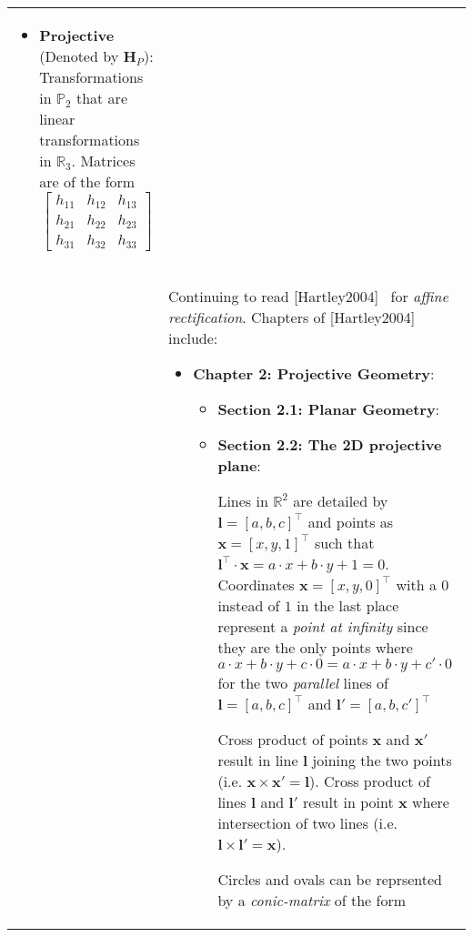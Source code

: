 \documentclass[a4paper,10pt]{article}
\newcommand{\logentry}[4]{\hline\\[-0.25ex]\selectlanguage{USenglish}\formatdate{#2}{#1}{#3}&{#4}\par\\[-0.25ex]}
\begin{document}
\begin{longtable}{l p{12cm} }
{{\begin{itemize}
\item \textbf{Projective} (Denoted by $\mathbf{H}_P$): Transformations in $\mathbb{P}_2$ that are linear transformations in $\mathbb{R}_3$. Matrices are of the form
\begin{equation*}
\begin{bmatrix}h_{11} & h_{12} & h_{13} \\ h_{21} & h_{22} & h_{23} \\ h_{31} & h_{32} & h_{33} \end{bmatrix}
\end{equation*}


\end{itemize}

}

	}
	\logentry{6}{29}{2016}{%
Continuing to read [Hartley2004]~\cite{Hartley2004} for \textit{affine rectification}. Chapters of [Hartley2004]~\cite{Hartley2004} include:\newline
\begin{itemize}
\item \textbf{Chapter 2: Projective Geometry}:
\begin{itemize}
\item \textbf{Section 2.1: Planar Geometry}:
\item \textbf{Section 2.2: The 2D projective plane}:\newline
\par
Lines in $\mathbb{R}^{2}$ are detailed by $\mathbf{l}=[a,b,c]^{\intercal}$ and points as $\mathbf{x}=[x,y,1]^\intercal$ such that $\mathbf{l}^{\intercal}\cdot\mathbf{x}=a\cdot{x}+b\cdot{y}+1=0$. Coordinates $\mathbf{x}=[x,y,0]^\intercal$ with a $0$ instead of $1$ in the last place represent a \textit{point at infinity} since they are the only points where $a\cdot{x}+b\cdot{y}+c\cdot{0}=a\cdot{x}+b\cdot{y}+c'\cdot{0}$ for the two \textit{parallel} lines of $\mathbf{l}=[a,b,c]^\intercal$ and $\mathbf{l'}=[a,b,c']^\intercal$
\newline
\par Cross product of points $\mathbf{x}$ and $\mathbf{x'}$ result in line $\mathbf{l}$ joining the two points (i.e. $\mathbf{x}\times\mathbf{x'}=\mathbf{l}$). Cross product of lines $\mathbf{l}$ and $\mathbf{l'}$ result in point $\mathbf{x}$ where intersection of two lines (i.e. $\mathbf{l}\times\mathbf{l'}=\mathbf{x}$).\newline
\par Circles and ovals can be reprsented by a \textit{conic-matrix} of the form
\begin{equation*}

\end{equation*}
\end{itemize}
\end{itemize}}
\end{longtable}
\end{document}
